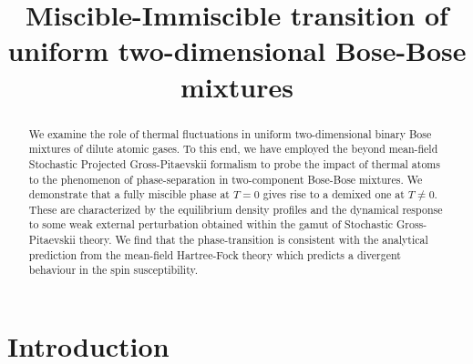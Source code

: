 \documentclass[pra,twocolumn,aps,showpacs,longbibliography]{revtex4-1}
\begin{document}
	
	\title[]{Miscible-Immiscible transition of uniform two-dimensional Bose-Bose mixtures}
	\author{}



\begin{abstract}
 We examine the role of thermal fluctuations in uniform two-dimensional binary Bose mixtures
of dilute atomic gases. To this end, we have employed the beyond mean-field Stochastic Projected Gross-Pitaevskii
formalism to probe the impact of thermal atoms to the phenomenon of phase-separation in
two-component Bose-Bose mixtures. We demonstrate that a fully miscible phase at $T=0$ gives rise to a demixed
one at $T\neq0$. These are characterized by the equilibrium density profiles and the dynamical response to 
some weak external perturbation obtained within the gamut of Stochastic Gross-Pitaevskii theory. We find that the 
phase-transition is consistent with the analytical prediction from the mean-field Hartree-Fock theory which 
predicts a divergent behaviour in the spin susceptibility.
\end{abstract}




\maketitle

\section{Introduction}\label{Introduction}
\end{document}
